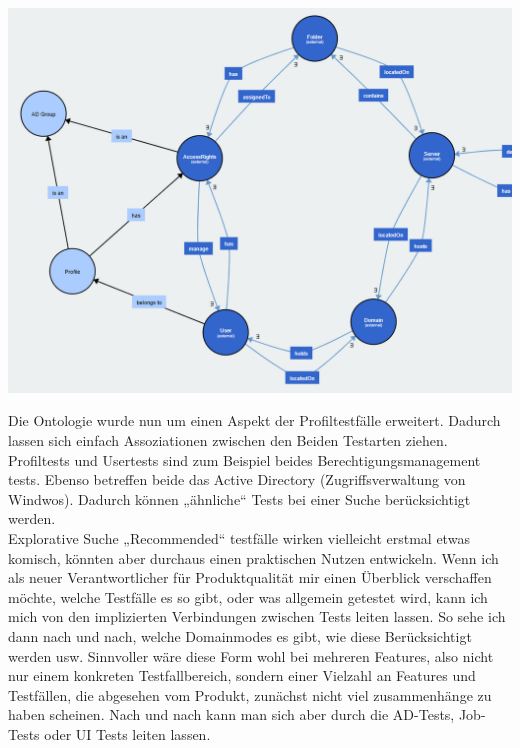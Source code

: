 \begin{center}
    \includegraphics[width=1\textwidth]{Thesis/Images/OntologyProfiles.png}
\end{center}

Die Ontologie wurde nun um einen Aspekt der Profiltestfälle erweitert. Dadurch lassen sich einfach Assoziationen zwischen den Beiden Testarten ziehen. Profiltests und Usertests sind zum Beispiel beides Berechtigungsmanagement tests. Ebenso betreffen beide das Active Directory (Zugriffsverwaltung von Windwos). Dadurch können „ähnliche“ Tests bei einer Suche berücksichtigt werden.\\

Explorative Suche\newline
„Recommended“ testfälle wirken vielleicht erstmal etwas komisch, könnten aber durchaus einen praktischen Nutzen entwickeln. Wenn ich als neuer Verantwortlicher für Produktqualität mir einen Überblick verschaffen möchte, welche Testfälle es so gibt, oder was allgemein getestet wird, kann ich mich von den implizierten Verbindungen zwischen Tests leiten lassen. So sehe ich dann nach und nach, welche Domainmodes es gibt, wie diese Berücksichtigt werden usw. Sinnvoller wäre diese Form wohl bei mehreren Features, also nicht nur einem konkreten Testfallbereich, sondern einer Vielzahl an Features und Testfällen, die abgesehen vom Produkt, zunächst nicht viel zusammenhänge zu haben scheinen. Nach und nach kann man sich aber durch die AD-Tests, Job-Tests oder UI Tests leiten lassen. 

